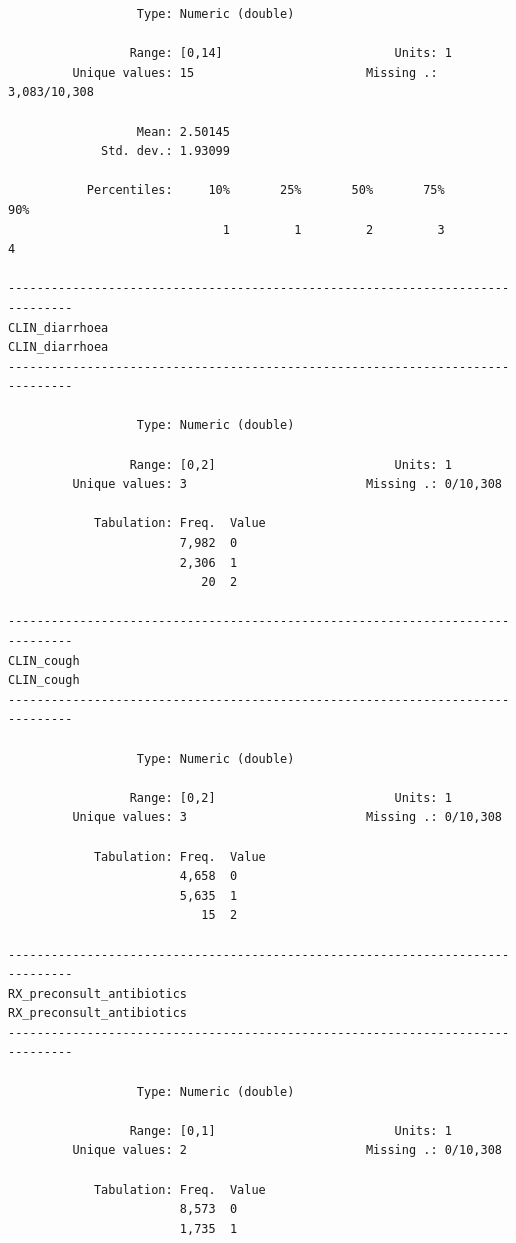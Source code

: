 \documentclass[
  letterpaper,
  DIV=11,
  numbers=noendperiod,
  oneside]{scrreprt}
\begin{document}
\begin{verbatim}
                  Type: Numeric (double)

                 Range: [0,14]                        Units: 1
         Unique values: 15                        Missing .: 3,083/10,308

                  Mean: 2.50145
             Std. dev.: 1.93099

           Percentiles:     10%       25%       50%       75%       90%
                              1         1         2         3         4

-------------------------------------------------------------------------------
CLIN_diarrhoea                                                   CLIN_diarrhoea
-------------------------------------------------------------------------------

                  Type: Numeric (double)

                 Range: [0,2]                         Units: 1
         Unique values: 3                         Missing .: 0/10,308

            Tabulation: Freq.  Value
                        7,982  0
                        2,306  1
                           20  2

-------------------------------------------------------------------------------
CLIN_cough                                                           CLIN_cough
-------------------------------------------------------------------------------

                  Type: Numeric (double)

                 Range: [0,2]                         Units: 1
         Unique values: 3                         Missing .: 0/10,308

            Tabulation: Freq.  Value
                        4,658  0
                        5,635  1
                           15  2

-------------------------------------------------------------------------------
RX_preconsult_antibiotics                             RX_preconsult_antibiotics
-------------------------------------------------------------------------------

                  Type: Numeric (double)

                 Range: [0,1]                         Units: 1
         Unique values: 2                         Missing .: 0/10,308

            Tabulation: Freq.  Value
                        8,573  0
                        1,735  1


\end{verbatim}
\end{document}
